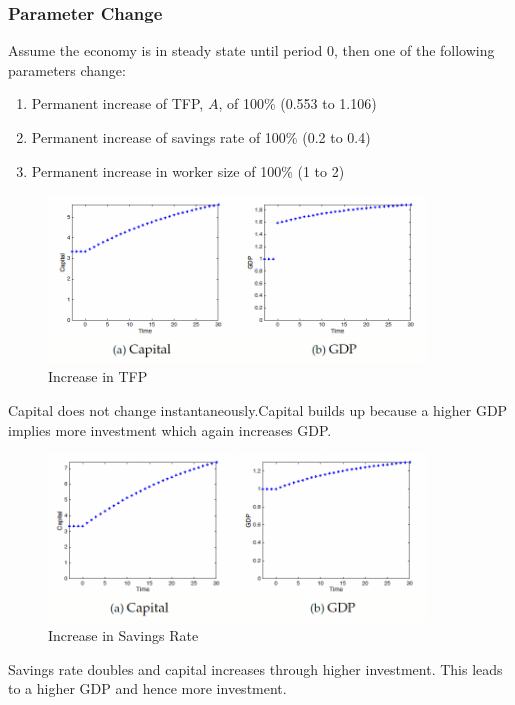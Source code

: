 \documentclass[11pt]{article}
\begin{document}
\subsubsection{Parameter Change}

Assume the economy is in steady state until period 0, then one of the following parameters change:
\begin{enumerate}
    \item Permanent increase of TFP, $A$, of 100\% (0.553 to 1.106)
    \item Permanent increase of savings rate of 100\% (0.2 to 0.4)
    \item Permanent increase in worker size of 100\% (1 to 2)
\end{enumerate}

\begin{figure}[h]
    \centering
    \includegraphics[width=10cm]{photos/double A.png}
    \caption{Increase in TFP}
    \label{fig:increase A}
\end{figure}

\begin{intu}
    Capital does not change instantaneously.Capital builds up because a higher GDP implies more investment which again increases GDP.
\end{intu}
\begin{figure}[h]
    \centering
    \includegraphics[width=10cm]{photos/double s.png}
    \caption{Increase in Savings Rate}
    \label{fig:increase s}
\end{figure}

\begin{intu}
    Savings rate doubles and capital increases through higher investment. This leads to a higher GDP and hence more investment.
\end{intu}
\end{document}

